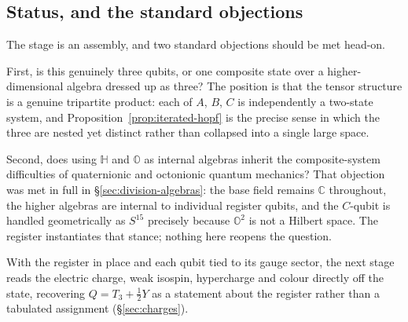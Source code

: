 \subsection{Status, and the standard objections}

The stage is an assembly, and two standard objections should be met head-on.

First, is this genuinely three qubits, or one composite state over a higher-dimensional algebra
dressed up as three? The position is that the tensor structure is a genuine tripartite product:
each of $A$, $B$, $C$ is independently a two-state system, and Proposition~\ref{prop:iterated-hopf}
is the precise sense in which the three are nested yet distinct rather than collapsed into a single
large space.

Second, does using $\mathbb{H}$ and $\mathbb{O}$ as internal algebras inherit the composite-system
difficulties of quaternionic and octonionic quantum mechanics? That objection was met in full in
\S\ref{sec:division-algebras}: the base field remains $\mathbb{C}$ throughout, the higher
algebras are internal to individual register qubits, and the $C$-qubit is handled geometrically as
$S^{15}$ precisely because $\mathbb{O}^{2}$ is not a Hilbert space. The register instantiates that
stance; nothing here reopens the question.

With the register in place and each qubit tied to its gauge sector, the next stage reads the
electric charge, weak isospin, hypercharge and colour directly off the state, recovering
$Q = T_3 + \tfrac12 Y$ as a statement about the register rather than a tabulated assignment
(\S\ref{sec:charges}).
